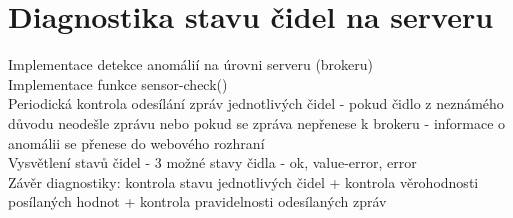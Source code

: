 \section{Diagnostika stavu čidel na serveru} \label{sec:error_detection_server}

Implementace detekce anomálií na úrovni serveru (brokeru) \\
Implementace funkce sensor-check() \\
Periodická kontrola odesílání zpráv jednotlivých čidel - pokud čidlo z neznámého důvodu neodešle zprávu nebo pokud se zpráva nepřenese k brokeru - informace o anomálii se přenese do webového rozhraní \\
Vysvětlení stavů čidel - 3 možné stavy čidla - ok, value-error, error \\

Závěr diagnostiky: kontrola stavu jednotlivých čidel + kontrola věrohodnosti posílaných hodnot + kontrola pravidelnosti odesílaných zpráv
